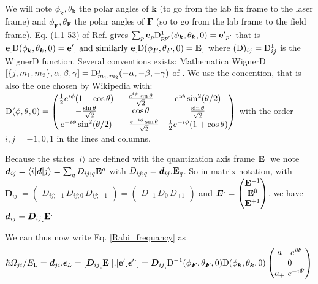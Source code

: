 \documentclass[amsmath,amssymb,nofootinbib]{revtex4-2}
\begin{document}
	We will note $\phi_{\bm k},\theta_{\bm k}$ the polar angles of ${\bm k}$ (to go from the lab fix frame to the laser  frame) and  $\phi_{\bm F},\theta_{\bm F}$ the polar angles of ${\bm F}$ (so to go from the lab frame to the field  frame). Eq. (1.1 53)  of Ref.
	\cite{varshalovich1988quantum} gives
	$ \sum_p	{\bf e}_{p}  {\rm  D}_{p p'}^{1} (\phi_{\bm k},\theta_{\bm k},0)  = {\bf e'}_{p'} $
that is 		
$	{\bf e}_. {\rm {\bm D}} (\phi_{\bm k},\theta_{\bm k},0)  = {\bf e'}_. \mbox{ and similarly } {\bf e}_. {\rm {\bm  D}} (\phi_{\bm F},\theta_{\bm F},0)  = {\bf E}_. $
	 where
	  $({\rm {\bm  D}})_{ij} = {\rm  D}_{i j}^{1} $ is the
	WignerD function.
	 Several conventions exists: Mathematica 
	WignerD$[\{j,m_1,m_2\},\alpha, \beta, \gamma]= {\rm  D}_{m_1,m_2}^j	(-\alpha, -\beta, -\gamma)$ of 	\cite{varshalovich1988quantum}. We use the  \cite{varshalovich1988quantum} concention, that is also the one chosen by Wikipedia with:	
	 $ {\rm {\bm  D}}  (\phi,\theta,0) =
	\begin{pmatrix}
	\frac{1}{2} e^{i \phi} (1+\cos \theta) &\frac{e^{i \phi} \sin \theta}{\sqrt{2}}  & e^{i \phi} \sin^2(\theta/2) \\
	-\frac{\sin \theta}{\sqrt{2}}	& \cos \theta	&  \frac{\sin \theta}{\sqrt{2}}	\\
	e^{-i \phi}  \sin^2(\theta/2)  & -\frac{e^{-i \phi} \sin \theta}{\sqrt{2}}  &  \frac{1}{2} e^{-i \phi} (1+\cos \theta) \end{pmatrix}
	$ with the order $i,j = -1,0,1$ in the lines and columns.
	
 Because the states $|i\rangle$ are defined with the quantization axis frame ${\bf{E}}_.$ we note
	 $ \bm d_{ij} = \langle i | \bm d | j \rangle  = \sum_q D_{ij;q} {\bf{E}}^q $ with $ D_{ij;q} = \bm d_{ij}.{\bf{E}}_q$. So in matrix notation, with
$	 {\bm D_{ij}}_.  = \begin{pmatrix}D_{ij;-1} \, D_{ij;0} \, D_{ij;+1} \end{pmatrix}  = \begin{pmatrix}D_{-1} \, D_{0} \, D_{+1} \end{pmatrix}   $ 
	and $ {\bm E}^. = \begin{pmatrix} 	{\bf E}^{-1} \\	{\bf E}^{0} \\	{\bf E}^{+1}
	\end{pmatrix}$, we have 
	$\bm d_{ij} =  {\bm D_{ij}}_. {\bf E}^.  $
 
	 	We can thus now write Eq. \ref{Rabi_frequancy} as
	 	 \begin{equation}
	 	 \hbar  \Omega_{ji} /  E_{\rm L}  = \bm d_{ji} . \bm \epsilon_L =  [ {\bm D_{ij}}_. {\bf E}^.  ].[ {\bf e'}_.  {\bm \epsilon'}^. ]
	   =  {\bm D_{ij}}_. 	{\rm {\bm  D}}^{-1} (\phi_{\bm F},\theta_{\bm F},0) 
	 	 {\rm{ \bm  D}} (\phi_{\bm k},\theta_{\bm k},0)  \begin{pmatrix}a_{-} \ e^{i \Psi}  \\ 0 \\ a_{+} \ e^{-i \Psi}
	 	 \end{pmatrix}  
	 	 \end{equation}
	 	 
\end{document}
